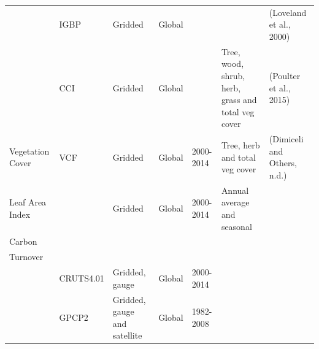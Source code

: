 \documentclass[bg, manuscript]{copernicus}
\begin{document}
\begin{table}
\begin{tabular}{lllllll}
                                   & IGBP                                   & Gridded                      & Global          &                                                       &                                                                      &  (Loveland et al., 2000)    \\
                                   & CCI                                    & Gridded                      & Global          &                                                       & \multirow{-2}{*}{Tree, wood, shrub, herb, grass and total veg cover} &  (Poulter et al., 2015)      \\
\multirow{-3}{*}{Vegetation Cover} & VCF                                    & Gridded                      & Global          & 2000-2014                                             & Tree, herb and total veg cover                                       & (Dimiceli and Others, n.d.) \\
Leaf Area Index                    &                                        & Gridded                      & Global          & 2000-2014                                             & Annual average and seasonal                                          &                                                 \\
Carbon                             &                                        &                              &                 &                                                       &                                                                      &                                                 \\
Turnover                           &                                        &                              &                 &                                                       &                                                                      &                                                 \\
                                   & CRUTS4.01                              & Gridded, gauge               & Global          & 2000-2014                                             &                                                                      &                                                 \\
                                   & GPCP2                                  & Gridded, gauge and satellite & Global          & 1982-2008                                             &                                                                      &                                                 \\

\end{tabular}
\end{table}
\end{document}
